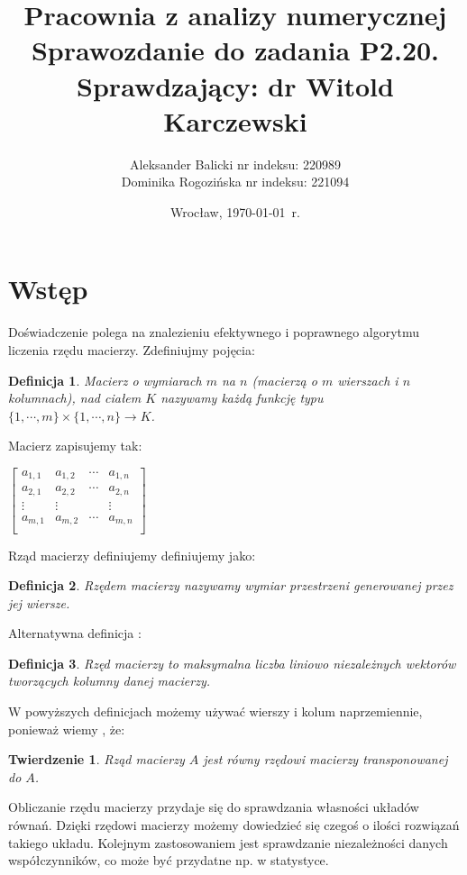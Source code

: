 \documentclass[a4paper,10pt]{article}
\title{{\textbf{Pracownia z analizy numerycznej}}\\[1ex]
       {\Large Sprawozdanie do zadania \textbf{P2.20.}}\\[-1ex]
       {\large Sprawdzający: dr Witold Karczewski}}
\author{Aleksander Balicki \large nr indeksu: 220989\\
	Dominika Rogozińska \large nr indeksu: 221094}
\date{Wrocław, \today\ r.}
\newtheorem{definition}{Definicja}
\newtheorem{theorem}{Twierdzenie}
\begin{document}
\maketitle

\section{Wstęp}
\setcounter{equation}{0}
Doświadczenie polega na znalezieniu efektywnego i poprawnego algorytmu liczenia rzędu macierzy. Zdefiniujmy pojęcia:
\begin{definition}
	Macierz o wymiarach $m$ na $n$ (macierzą o $m$ wierszach i $n$ kolumnach), nad ciałem $K$ nazywamy każdą funkcję typu $\{1,\cdots,m\} \times \{1,\cdots,n\} \rightarrow K$.
\end{definition}
Macierz zapisujemy tak:
\begin{center}
	$ \left[ \begin{array}{cccc}
		a_{1,1} & a_{1,2} & \cdots & a_{1,n}\\
		a_{2,1} & a_{2,2} & \cdots & a_{2,n}\\
		\vdots  &  \vdots &        & \vdots \\
		a_{m,1} & a_{m,2} & \cdots & a_{m,n}\\
	\end{array} \right] $
\end{center}
Rząd macierzy definiujemy \cite{EK} definiujemy jako:
\begin{definition}
	Rzędem macierzy nazywamy wymiar przestrzeni generowanej przez jej wiersze.
\end{definition}
Alternatywna definicja \cite{Wi}:
\begin{definition}
	Rzęd macierzy to maksymalna liczba liniowo niezależnych wektorów tworzących kolumny danej macierzy.
\end{definition}

W powyższych definicjach możemy używać wierszy i kolum naprzemiennie, ponieważ wiemy \cite{EK}, że:
\begin{theorem}
	Rząd macierzy $A$ jest równy rzędowi macierzy transponowanej do $A$.
\end{theorem}

Obliczanie rzędu macierzy przydaje się do sprawdzania własności układów równań.
Dzięki rzędowi macierzy możemy dowiedzieć się czegoś o ilości rozwiązań takiego układu.
Kolejnym zastosowaniem jest sprawdzanie niezależności danych współczynników, co może być przydatne np. w statystyce.
\end{document}

